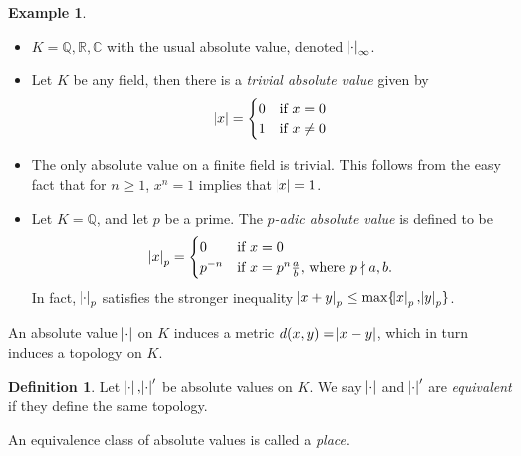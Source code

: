 \documentclass[11pt]{article}
\theoremstyle{definition}
\newtheorem{definition}{Definition}[subsection]
\newtheorem*{example}{Example}
\theoremstyle{plain}
\theoremstyle{remark}
\newcommand{\bQ}{\mathbb{Q}}
\newcommand{\bR}{\mathbb{R}}
\newcommand{\bC}{\mathbb{C}}
\begin{document}
\begin{example}\phantom{}
    \begin{itemize}
        \item $K = \bQ, \bR, \bC$ with the usual absolute value, denoted $\abs{\cdot}_\infty$.
        \item Let $K$ be any field, then there is a \emph{trivial absolute value} given by
            \begin{equation*}
                \abs{x} =
                \begin{cases}
                    0 & \text{if } x = 0 \\
                    1 & \text{if } x \neq 0
                \end{cases}
            \end{equation*}
        \item The only absolute value on a finite field is trivial. This follows from the easy fact that for $n \ge 1$, $x^n = 1$ implies that $\abs{x} = 1$.
        \item Let $K = \bQ$, and let $p$ be a prime. The \emph{$p$-adic absolute value} is defined to be
            \begin{equation*}
                \abs{x}_p =
                \begin{cases}
                    0 & \text{if } x = 0 \\
                    p^{-n} & \text{if } x = p^n \frac{a}{b}\text{, where } p \nmid a, b.
                \end{cases}
            \end{equation*}
            In fact, $\abs{\cdot}_p$ satisfies the stronger inequality $\abs{x + y}_p \le \max\{\abs{x}_p, \abs{y}_p\}$.
    \end{itemize}
\end{example}

\noindent An absolute value $\abs{\cdot}$ on $K$ induces a metric $d(x, y) = \abs{x - y}$, which in turn induces a topology on $K$.

\begin{definition}
    Let $\abs{\cdot}, \abs{\cdot}'$ be absolute values on $K$. We say $\abs{\cdot}$ and $\abs{\cdot}'$ are \emph{equivalent} if they define the same topology.

    An equivalence class of absolute values is called a \emph{place}.
\end{definition}
\end{document}

